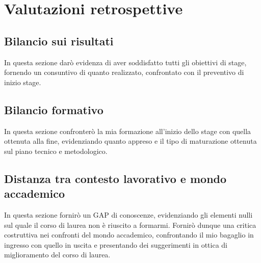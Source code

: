 
\chapter{Valutazioni retrospettive}
\label{cap:analisi-requisiti}

\section{Bilancio sui risultati}

In questa sezione darò evidenza di aver soddisfatto tutti gli obiettivi di stage, fornendo un consuntivo di quanto realizzato, confrontato con il preventivo di inizio stage.

\section{Bilancio formativo}

In questa sezione confronterò la mia formazione all'inizio dello stage con quella ottenuta alla fine, evidenziando quanto appreso e il tipo di maturazione ottenuta sul piano tecnico e metodologico.

\section{Distanza tra contesto lavorativo e mondo accademico}

In questa sezione fornirò un GAP di conoscenze, evidenziando gli elementi nulli sul quale il corso di laurea non è riuscito a formarmi. Fornirò dunque una critica costruttiva nei confronti del mondo accademico, confrontando il mio bagaglio in ingresso con quello in uscita e presentando dei suggerimenti in ottica di miglioramento del corso di laurea.
